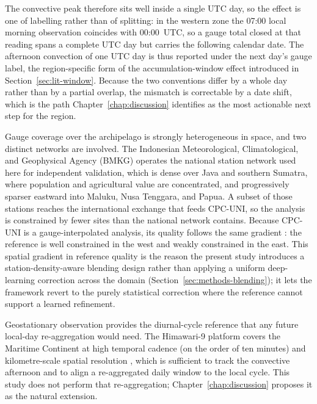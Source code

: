 The convective peak therefore sits well inside a single UTC day, so
the effect is one of labelling rather than of splitting: in the western zone
the 07:00 local morning observation coincides with 00:00~UTC, so a
gauge total closed at that reading spans a complete UTC day but
carries the following calendar date. The afternoon convection of
one UTC day is thus reported under the next day's gauge label, the
region-specific form of the accumulation-window effect
introduced in Section~\ref{sec:lit-window}. Because the two
conventions differ by a whole day rather than by a partial
overlap, the mismatch is correctable by a date shift, which is the
path Chapter~\ref{chap:discussion}
identifies as the most actionable next step for the region.

Gauge coverage over the archipelago is strongly heterogeneous in
space, and two distinct networks are involved. The Indonesian
Meteorological, Climatological, and Geophysical Agency (BMKG)
operates the national station network used here for independent
validation, which is dense over Java and southern
Sumatra, where population and agricultural value are
concentrated, and progressively sparser eastward into Maluku,
Nusa Tenggara, and Papua. A subset of those stations reaches the
international exchange that feeds CPC-UNI, so the analysis is
constrained by fewer sites than the national network contains.
Because CPC-UNI is
a gauge-interpolated analysis, its quality follows the same
gradient \citep{ref:xie2007, ref:chen2008}: the reference is well constrained in the west and
weakly constrained in the east. This spatial gradient in
reference quality is the reason the present study introduces a
station-density-aware blending design rather than applying a
uniform deep-learning correction across the domain
(Section~\ref{sec:methods-blending}); it lets the framework
revert to the purely statistical correction where the reference
cannot support a learned refinement.

Geostationary observation provides the diurnal-cycle reference
that any future local-day re-aggregation would need. The
Himawari-9 platform covers the Maritime Continent at high
temporal cadence (on the order of ten minutes) and
kilometre-scale spatial resolution \citep{ref:bessho2016}, which is
sufficient to track
the convective afternoon and to align a re-aggregated daily
window to the local cycle. This study does not perform that
re-aggregation; Chapter~\ref{chap:discussion} proposes it as the
natural extension.


